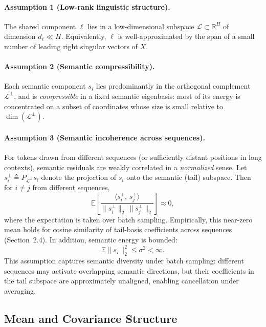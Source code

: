 \paragraph{Assumption 1 (Low-rank linguistic structure).}
The shared component $\ell$ lies in a low-dimensional subspace
$\mathcal{L} \subset \mathbb{R}^H$ of dimension $d_\ell \ll H$.
Equivalently, $\ell$ is well-approximated by the span of a small number of
leading right singular vectors of $X$.

\paragraph{Assumption 2 (Semantic compressibility).}
Each semantic component $s_i$ lies predominantly in the orthogonal complement
$\mathcal{L}^\perp$, and is \emph{compressible} in a fixed semantic eigenbasis:
most of its energy is concentrated on a subset of coordinates whose size is
small relative to $\dim(\mathcal{L}^\perp)$.

\paragraph{Assumption 3 (Semantic incoherence across sequences).}
For tokens drawn from different sequences (or sufficiently distant positions in
long contexts), semantic residuals are weakly correlated in a \emph{normalized}
sense.
Let $s_i^{\perp} \triangleq P_{\mathcal{L}^\perp}s_i$ denote the projection of
$s_i$ onto the semantic (tail) subspace.
Then for $i\neq j$ from different sequences,
\begin{equation}
\label{eq:assump_cos_incoh}
\mathbb{E}\!\left[
\frac{\langle s_i^{\perp},\, s_j^{\perp}\rangle}
{\|s_i^{\perp}\|_2\,\|s_j^{\perp}\|_2}
\right] \approx 0,
\end{equation}
where the expectation is taken over batch sampling.
Empirically, this near-zero mean holds for cosine similarity of tail-basis
coefficients across sequences (Section~2.4).
In addition, semantic energy is bounded:
\begin{equation}
\label{eq:assump_sem_moment}
\mathbb{E}\|s_i\|_2^2 \le \sigma^2 < \infty.
\end{equation}
This assumption captures semantic diversity under batch sampling: different
sequences may activate overlapping semantic directions, but their coefficients
in the tail subspace are approximately unaligned, enabling cancellation under
averaging.

\subsection{Mean and Covariance Structure}

